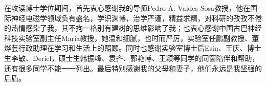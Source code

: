 
\thesisacknowledgement
在攻读博士学位期间，首先衷心感谢我的导师Pedro A. Valdes-Sosa教授，他在国际神经电磁学领域负有盛名，学识渊博，治学严谨，精益求精，对科研的孜孜不倦的热情感染了我，其不拘一格别有建树的思维影响了我；也衷心感谢中国古巴神经科技实验室副主任Maria教授，她温和细腻，也时而严厉，实验室任鹏副教授、董烨芸行政助理在学习和生活上的照顾。同时也感谢实验室博士后Esin、王庆、博士生李敏、Deriel，硕士生韩振峰、袁齐、郭艳博、王颖等同学的同窗陪伴和帮助，还有很多同学不能一一列出。最后特别感谢我的父母和妻子，他们永远是我坚强的后盾。
